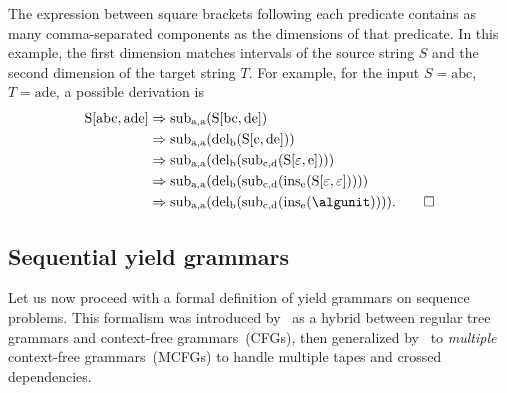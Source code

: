 \begin{example}
    The expression between square brackets following each predicate contains as many comma-separated components as the dimensions of that predicate.
    In this example, the first dimension matches intervals of the source string \(S\) and the second dimension of the target string \(T\).
    For example, for the input \(S = \text{abc}\), \(T = \text{ade}\), a possible derivation is
    \begin{align*}
        \gramnt{S}[\text{abc}, \text{ade}]
        &\gramrew \algsym{sub}_{\text{a},\text{a}}(\gramnt{S}[\text{bc}, \text{de}]) \\
        &\gramrew \algsym{sub}_{\text{a},\text{a}}(\algsym{del}_\text{b}(\gramnt{S}[\text{c}, \text{de}])) \\
        &\gramrew \algsym{sub}_{\text{a},\text{a}}(\algsym{del}_\text{b}(\algsym{sub}_{\text{c},\text{d}}(\gramnt{S}[\varepsilon, \text{e}]))) \\
        &\gramrew \algsym{sub}_{\text{a},\text{a}}(\algsym{del}_\text{b}(\algsym{sub}_{\text{c},\text{d}}(\algsym{ins}_\text{e}(\gramnt{S}[\varepsilon, \varepsilon])))) \\
        &\gramrew \algsym{sub}_{\text{a},\text{a}}(\algsym{del}_\text{b}(\algsym{sub}_{\text{c},\text{d}}(\algsym{ins}_\text{e}(\algunit)))).
        \qedhere
    \end{align*}
\end{example}



\subsection{Sequential yield grammars}

Let us now proceed with a formal definition of yield grammars on sequence problems.
This formalism was introduced by~\textcite{Giegerich2004DisciplineDynamicProgramming} as a hybrid between regular tree grammars and context-free grammars~(CFGs),
then generalized by~\textcite{Riechert2016AlgebraicDynamicProgramming} to \emph{multiple} context-free grammars~(MCFGs) to handle multiple tapes and crossed dependencies.


